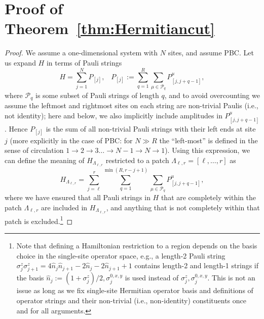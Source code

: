 \documentclass[prx,letterpaper,aps,superscriptaddress,floatfix,twocolumn,nofootinbib]{revtex4-2}
\theoremstyle{definition}
\newcommand{\mP}{\mathcal{P}}
\newcommand{\defn}{:=}
\begin{document}
%
\section{Proof of Theorem~\ref{thm:Hermitiancut}}
\label{app:cuttingproof}
%
\begin{proof}
%
We assume a one-dimensional system with $N$ sites, and assume PBC.
%
Let us expand $H$ in terms of Pauli strings
\begin{equation}
    H = \sum_{j = 1}^N{P_{[j]}},\;\;\;
    P_{[j]} \defn \sum_{q = 1}^{R}\sum_{\mu \in \mP_q}{P^{\mu}_{[j,j+q-1]}},
\label{eq:Hfull}
\end{equation}
where $\mP_q$ is some subset of Pauli strings of length $q$, and to avoid overcounting we assume the leftmost and rightmost sites on each string are non-trivial Paulis (i.e., not identity); here and below, we also implicitly include amplitudes in $P^{\mu}_{[j,j+q-1]}$.
%
Hence $P_{[j]}$ is the sum of all non-trivial Pauli strings with their left ends at site $j$ (more explicitly in the case of PBC: for $N \gg R$ the ``left-most'' is defined in the sense of circulation $1 \to 2 \to 3 \dots \to N-1 \to N \to 1$). 
%
Using this expression, we can define the meaning of $H_{\Lambda_{\ell,r}}$ restricted to a patch $\Lambda_{\ell,r} = [\ell,\dots,r]$ as
\begin{equation}
    H_{\Lambda_{\ell,r}} = \sum_{j = \ell}^{r}{\sum_{q = 1}^{\min(R, r - j +1)}\sum_{\mu \in \mP_q}{P^{\mu}_{[j,j+q-1]}}},
\label{eq:Hlamfull}
\end{equation}
where we have ensured that all Pauli strings in $H$ that are completely within the patch $\Lambda_{\ell,r}$ are included in $H_{\Lambda_{\ell,r}}$, and anything that is not completely within that patch is excluded.\footnote{Note that defining a Hamiltonian restriction to a region depends on the basis choice in the single-site operator space, e.g., a length-2 Pauli string $\sigma_j^z \sigma_{j+1}^z = 4\hat{n}_j \hat{n}_{j+1} - 2\hat{n}_j - 2\hat{n}_{j+1} + 1$ contains length-2 and length-1 strings if the basis $\hat{n}_j \defn (1+\sigma_j^z)/2, \sigma_j^{0,x,y}$ is used instead of $\sigma_j^z,\sigma_j^{0,x,y}$.
This is not an issue as long as we fix single-site Hermitian operator basis and definitions of operator strings and their non-trivial (i.e., non-identity) constituents once and for all arguments.}
%


\end{proof}
\end{document}
